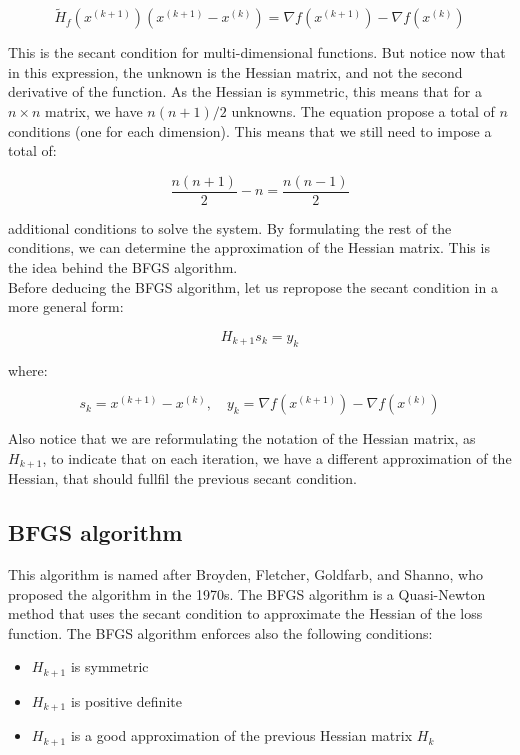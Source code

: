 \begin{equation}
    \tilde{H}_f(x^{(k+1)}) (x^{(k+1)} - x^{(k)}) = \nabla f(x^{(k+1)}) - \nabla f(x^{(k)})
\end{equation}

This is the secant condition for multi-dimensional functions. But notice now that in this
expression, the unknown is the Hessian matrix, and not the second derivative of the function.
As the Hessian is symmetric, this means that for a $n \times n$ matrix, we have $n(n+1)/2$ unknowns.
The equation propose a total of $n$ conditions (one for each dimension). This means that we still
need to impose a total of:

$$\frac{n(n+1)}{2} - n = \frac{n(n-1)}{2}$$

additional conditions to solve the system. By formulating the rest of the conditions, we can
determine the approximation of the Hessian matrix. This is the idea behind the BFGS algorithm.\\

Before deducing the BFGS algorithm, let us repropose the secant condition in a more general form:

\begin{equation}
    H_{k+1} s_{k} = y_{k}
\end{equation}

where:

$$ s_{k} = x^{(k+1)} - x^{(k)}, \quad y_{k} = \nabla f(x^{(k+1)}) - \nabla f(x^{(k)})$$

Also notice that we are reformulating the notation of the Hessian matrix, as $H_{k+1}$, to indicate
that on each iteration, we have a different approximation of the Hessian, that should fullfil the previous
secant condition.

\subsection{BFGS algorithm}

This algorithm is named after Broyden, Fletcher, Goldfarb, and Shanno, who proposed the algorithm in
the 1970s. The BFGS algorithm is a Quasi-Newton method that uses the secant condition to approximate
the Hessian of the loss function. The BFGS algorithm enforces also the following conditions:

\begin{itemize}
    \item $H_{k+1}$ is symmetric
    \item $H_{k+1}$ is positive definite
    \item $H_{k+1}$ is a good approximation of the previous Hessian matrix $H_k$
\end{itemize}

